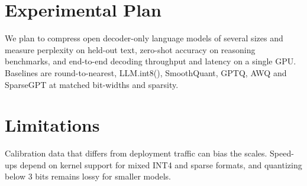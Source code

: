 \documentclass{article}
\begin{document}
\section{Experimental Plan}
We plan to compress open decoder-only language models of several sizes and
measure perplexity on held-out text, zero-shot accuracy on reasoning
benchmarks, and end-to-end decoding throughput and latency on a single GPU.
Baselines are round-to-nearest, LLM.int8(), SmoothQuant, GPTQ, AWQ and
SparseGPT at matched bit-widths and sparsity.

\section{Limitations}
Calibration data that differs from deployment traffic can bias the scales.
Speed-ups depend on kernel support for mixed INT4 and sparse formats, and
quantizing below 3 bits remains lossy for smaller models.
\end{document}
